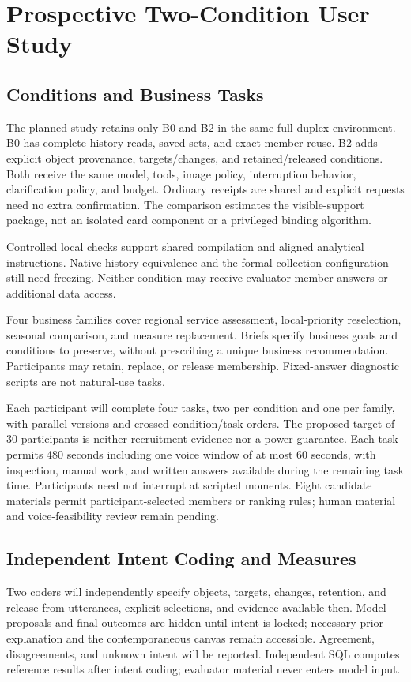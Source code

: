 \documentclass[conference,10pt,letterpaper]{IEEEtran}
\begin{document}
\section{Prospective Two-Condition User Study}
\subsection{Conditions and Business Tasks}
The planned study retains only B0 and B2 in the same full-duplex environment. B0 has complete history reads, saved sets, and exact-member reuse. B2 adds explicit object provenance, targets/changes, and retained/released conditions. Both receive the same model, tools, image policy, interruption behavior, clarification policy, and budget. Ordinary receipts are shared and explicit requests need no extra confirmation. The comparison estimates the visible-support package, not an isolated card component or a privileged binding algorithm.

Controlled local checks support shared compilation and aligned analytical instructions. Native-history equivalence and the formal collection configuration still need freezing. Neither condition may receive evaluator member answers or additional data access.

Four business families cover regional service assessment, local-priority reselection, seasonal comparison, and measure replacement. Briefs specify business goals and conditions to preserve, without prescribing a unique business recommendation. Participants may retain, replace, or release membership. Fixed-answer diagnostic scripts are not natural-use tasks.

Each participant will complete four tasks, two per condition and one per family, with parallel versions and crossed condition/task orders. The proposed target of 30 participants is neither recruitment evidence nor a power guarantee. Each task permits 480 seconds including one voice window of at most 60 seconds, with inspection, manual work, and written answers available during the remaining task time. Participants need not interrupt at scripted moments. Eight candidate materials permit participant-selected members or ranking rules; human material and voice-feasibility review remain pending.

\subsection{Independent Intent Coding and Measures}
Two coders will independently specify objects, targets, changes, retention, and release from utterances, explicit selections, and evidence available then. Model proposals and final outcomes are hidden until intent is locked; necessary prior explanation and the contemporaneous canvas remain accessible. Agreement, disagreements, and unknown intent will be reported. Independent SQL computes reference results after intent coding; evaluator material never enters model input.
\end{document}
